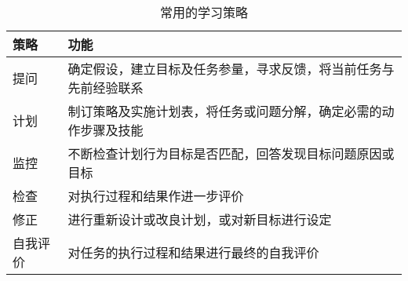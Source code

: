 \begin{table}[h]
    \centering
    \caption{常用的学习策略}
    \begin{tabular}{m{3cm}m{8cm}}
        \toprule
        \textbf{策略} & \textbf{功能} \\
        \midrule
        提问 & 确定假设，建立目标及任务参量，寻求反馈，将当前任务与先前经验联系 \\
        计划 & 制订策略及实施计划表，将任务或问题分解，确定必需的动作步骤及技能 \\
        监控 & 不断检查计划行为目标是否匹配，回答发现目标问题原因或目标 \\
        检查 & 对执行过程和结果作进一步评价 \\
        修正 & 进行重新设计或改良计划，或对新目标进行设定 \\
        自我评价 & 对任务的执行过程和结果进行最终的自我评价 \\
        \bottomrule
    \end{tabular}
\end{table}